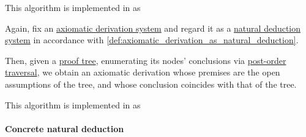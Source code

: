 \begin{comments}
  \item This algorithm is implemented in \cite{notebook:code} as
  \begin{CodeRefDisplay}
  \end{CodeRefDisplay}
\end{comments}

\begin{algorithm}\label{alg:propositional_proof_tree_to_axiomatic_derivation}
  Again, fix an \hyperref[def:propositional_axiomatic_derivation_system]{axiomatic derivation system} and regard it as a \hyperref[def:propositional_natural_deduction_system]{natural deduction system} in accordance with \cref{def:axiomatic_derivation_as_natural_deduction}.

  Then, given a \hyperref[def:propositional_natural_deduction_proof_tree]{proof tree}, enumerating its nodes' conclusions via \hyperref[def:ordered_tree_enumeration]{post-order traversal}, we obtain an axiomatic derivation whose premises are the open assumptions of the tree, and whose conclusion coincides with that of the tree.
\end{algorithm}
\begin{comments}
  \item This algorithm is implemented in \cite{notebook:code} as
  \begin{CodeRefDisplay}
  \end{CodeRefDisplay}
\end{comments}

\paragraph{Concrete natural deduction}

